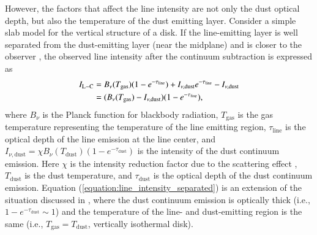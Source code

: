 \documentclass[linenumbers, twocolumn, twocolappendix, astrosymb, times]{aastex631}
\begin{document}
However, the factors that affect the line intensity are not only the dust optical depth, but also the temperature of the dust emitting layer. Consider a simple slab model for the vertical structure of a disk. If the line-emitting layer is well separated from the dust-emitting layer (near the midplane) and is closer to the observer \citep[see e.g.,][]{Bosman2021}, the observed line intensity after the continuum subtraction is expressed as 
\begin{align}\label{equation:line_intensity_separated}
    I_\mathrm{L-C} &= B_\nu(T_\mathrm{gas})(1 - e^{-\tau_\mathrm{line}}) + I_{\nu, \mathrm{dust}}e^{-\tau_\mathrm{line}} - I_{\nu, \mathrm{dust}} \notag \\
    &= (B_\nu(T_\mathrm{gas}) - I_{\nu, \mathrm{dust}})(1 - e^{-\tau_\mathrm{line}}),
\end{align}
where $B_\nu$ is the Planck function for blackbody radiation, $T_\mathrm{gas}$ is the gas temperature representing the temperature of the line emitting region, $\tau_\mathrm{line}$ is the optical depth of the line emission at the line center, and $I_{\nu, \mathrm{dust}} = \chi B_\nu(T_\mathrm{dust})(1 - e^{-\tau_\mathrm{dust}})$ is the intensity of the dust continuum emission. Here $\chi$ is the intensity reduction factor due to the scattering effect \citep[e.g.,][]{Bosman2021}, $T_\mathrm{dust}$ is the dust temperature, and $\tau_\mathrm{dust}$ is the optical depth of the dust continuum emission. Equation (\ref{equation:line_intensity_separated}) is an extension of the situation discussed in \citet{Bosman2021}, where the dust continuum emission is optically thick (i.e., $1 - e^{-\tau_\mathrm{dust}} \sim 1$) and the temperature of the line- and dust-emitting region is the same (i.e., $T_\mathrm{gas} = T_\mathrm{dust}$, vertically isothermal disk).
\end{document}
